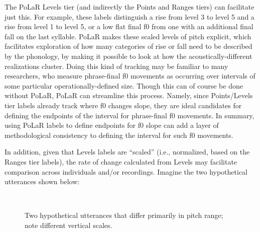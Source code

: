 \documentclass[11pt, twoside]{memoir}
\begin{document}
The PoLaR Levels tier (and indirectly the Points and Ranges tiers) can facilitate just this. For example, these labels distinguish a rise from level 3 to level 5 and a rise from level 1 to level 5, or a low flat final f0 from one with an additional final fall on the last syllable. PoLaR makes these scaled levels of pitch explicit, which facilitates exploration of how many categories of rise or fall need to be described by the phonology, by making it possible to look at how the acoustically-different realizations cluster. Doing this kind of tracking may be familiar to many researchers, who measure phrase-final f0 movements as occurring over intervals of some particular operationally-defined size. Though this can of course be done without PoLaR, PoLaR can streamline this process. Namely, since Points\slash Levels tier labels already track where f0 changes slope, they are ideal candidates for defining the endpoints of the interval for phrase-final f0 movements. In summary, using PoLaR labels to define endpoints for f0 slope can add a layer of methodological consistency to defining the interval for such f0 movements.

In addition, given that Levels labels are “scaled” (i.e., normalized, based on the Ranges tier labels), the rate of change calculated from Levels may facilitate comparison across individuals and/or recordings. Imagine the two hypothetical utterances shown below:

\begin{figure}[H]
\centering
%
\begin{tikzpicture}[scale=.85, transform shape]\end{tikzpicture}~~\begin{tikzpicture}[scale=.85, transform shape]\end{tikzpicture}
%
\caption{Two hypothetical utterances that differ primarily in pitch range; note different vertical scales.%
\label{fig:Usages-slopes}%
}
\end{figure}
\end{document}
